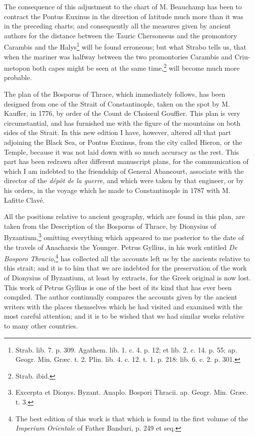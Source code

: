 \documentclass[a4paper, 11pt, oneside, polutonikogreek, english]{article}
\begin{document}
The consequence of this adjustment to the chart of M. Beauchamp has been to contract the Pontus Euxinus in the direction of latitude much more than it was in the preceding charts; and consequently all the measures given by ancient authors for the distance between the Tauric Chersonesus and the promontory Carambis and the Halys\footnote{Strab. lib. 7. p. 309. Agathem. lib. 1. c. 4. p. 12; et lib. 2. c. 14. p. 55; ap. Geogr. Min. Græc. t. 2. Plin. lib. 4. c. 12. t. 1. p. 218: lib. 6. c. 2. p. 301.} will be found erroneous; but what Strabo tells us, that when the mariner was halfway between the two promontories Carambis and Criu-metopon both capes might be seen at the same time,\footnote{Strab. ibid.} will become much more probable.

The plan of the Bosporus of Thrace, which immediately follows, has been designed from one of the Strait of Constantinople, taken on the spot by M. Kauffer, in 1776, by order of the Count de Choiseul Gouffier. This plan is very circumstantial, and has furnished me with the figure of the mountains on both sides of the Strait. In this new edition I have, however, altered all that part adjoining the Black Sea, or Pontus Euxinus, from the city called Hieron, or the Temple, because it was not laid down with so much accuracy as the rest. This part has been redrawn after different manuscript plans, for the communication of which I am indebted to the friendship of General Abancourt, associate with the director of the \emph{dépôt de la guerre}, and which were taken by that engineer, or by his orders, in the voyage which he made to Constantinople in 1787 with M. Lafitte Clavé.

All the positions relative to ancient geography, which are found in this plan, are taken from the Description of the Bosporus of Thrace, by Dionysius of Byzantium,\footnote{Excerpta et Dionys. Byzant. Anaplo. Bospori Thracii. ap. Geogr. Min. Græc. t. 3.} omitting everything which appeared to me posterior to the date of the travels of Anacharsis the Younger. Petrus Gyllius, in his work entitled \emph{De Bosporo Thracio},\footnote{The best edition of this work is that which is found in the first volume of the \emph{Imperium Orientale} of Father Banduri, p. 249 et seq.} has collected all the accounts left us by the ancients relative to this strait; and it is to him that we are indebted for the preservation of the work of Dionysius of Byzantium, at least by extracts, for the Greek original is now lost. This work of Petrus Gyllius is one of the best of its kind that has ever been compiled. The author continually compares the accounts given by the ancient writers with the places themselves which he had visited and examined with the most careful attention; and it is to be wished that we had similar works relative to many other countries.
\end{document}
